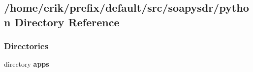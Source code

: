 \subsection{/home/erik/prefix/default/src/soapysdr/python Directory Reference}
\label{dir_dc2c16aa26a2ed5af695545df11f9b43}
\subsubsection*{Directories}
\begin{DoxyCompactItemize}
\item 
directory {\bf apps}
\end{DoxyCompactItemize}
